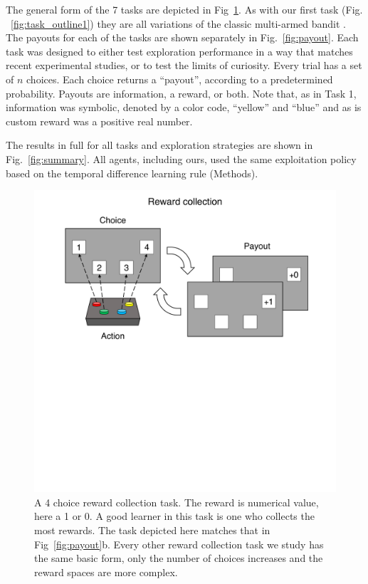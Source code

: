 The general form of the 7 tasks are depicted in Fig~\ref{fig:task_outline2}. As with our first task (Fig. ~\ref{fig:task_outline1}) they are all variations of the classic multi-armed bandit \citep{Sutton2018}. The payouts for each of the tasks are shown separately in Fig.~\ref{fig:payout}. Each task was designed to either test exploration performance in a way that matches recent experimental studies, or to test the limits of curiosity. Every trial has a set of $n$ choices. Each choice returns a “payout”, according to a predetermined probability. Payouts are information, a reward, or both. Note that, as in Task 1, information was symbolic, denoted by a color code, “yellow” and “blue” and as is custom reward was a positive real number. 

The results in full for all tasks and exploration strategies are shown in Fig.~\ref{fig:summary}. All agents, including ours, used the same exploitation policy based on the temporal difference learning rule \citep{Sutton2018} (Methods).

\begin{figure}
	\begin{fullwidth}
	\includegraphics[width=.55\linewidth]{img/task_outline2.pdf} 
	\caption{A 4 choice reward collection task. The reward is numerical value, here a 1 or 0. A good learner in this task is one who collects the most rewards. The task depicted here matches that in Fig~\ref{fig:payout}b. Every other reward collection task we study has the same basic form, only the number of choices increases and the reward spaces are more complex.}
	\label{fig:task_outline2} 
	\end{fullwidth}
\end{figure}

